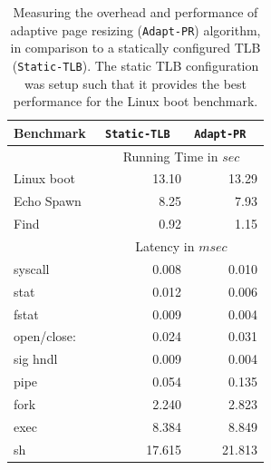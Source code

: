 \documentclass[10pt,twocolumn]{article}
\begin{document}
\begin{table}
\centering
      \begin{tabular}{|l| r r |} \hline
        Benchmark\verb, ,& {\tt Static-TLB} \verb, ,& {\tt Adapt-PR} \verb, , \\ \hline

     & \multicolumn{2}{c|}{Running Time in $sec$}\\ \cline {2-3}
Linux boot	&	13.10	&	13.29\\
Echo Spawn	&	8.25	&	7.93\\
Find	&	0.92	&	1.15\\
\cline{2-3}
     & \multicolumn{2}{c|}{Latency in $msec$}\\  \cline{2-3}
syscall	&	0.008	&	0.010\\
stat	 &	0.012	&	0.006\\
fstat	&	0.009	&	0.004\\
open/close:	&	0.024	&	0.031\\
sig hndl	&	0.009	&	0.004\\
pipe 	&	0.054	&	0.135\\
fork	&	2.240	&	2.823\\
exec	&	8.384	&	8.849\\
sh	&	17.615	&	21.813\\
 \hline
      \end{tabular}
\label{tab:detailed_results}
\caption{Measuring the overhead and performance of adaptive page resizing ({\tt Adapt-PR}) algorithm, in comparison to
a statically configured TLB ({\tt Static-TLB}). The static TLB configuration was setup such that it provides the best performance for the Linux boot benchmark.}
\end{table} 
\end{document}
